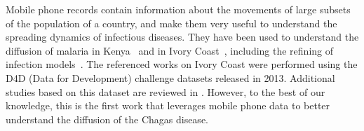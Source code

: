 Mobile phone records contain information about the movements of large subsets of the population of a country, and make them very useful to understand the spreading dynamics of infectious diseases. They have been used to understand the diffusion of malaria in Kenya~\cite{wesolowski2012quantifying} and in Ivory Coast~\cite{enns2013human}, including the refining of infection models~\cite{chunara2013large}. 
The referenced works on Ivory Coast were performed using the D4D (Data for Development) challenge datasets released in 2013. Additional studies based on this dataset are reviewed in \cite{naboulsi2015mobile}.
However, to the best of our knowledge, this is the first work that leverages mobile phone data to better understand the diffusion of the Chagas disease.

